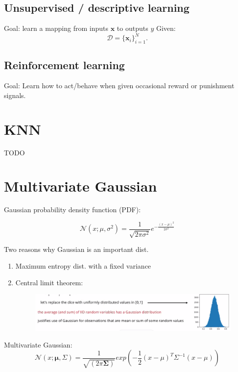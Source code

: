 \documentclass[12pt]{article}
\begin{document}
\subsection{Unsupervised / descriptive learning}
Goal: learn a mapping from inputs \(\mathbf{x}\) to outputs \(y\)
\newline
Given:
\[
    \mathcal{D} = \lbrace \mathbf{x}_i \rbrace_{i=1}^{N}.
\]

\subsection{Reinforcement learning}
Goal: Learn how to act/behave when given occasional reward or punishment signals.

\section{KNN}
TODO

\section{Multivariate Gaussian}
Gaussian probability density function (PDF):

\[
    \mathcal{N}(x;\mu,\sigma^2) = \frac{1}{\sqrt{2\pi\sigma^2}} e^{-\frac{(x-\mu)^2}{2\sigma^2}}
\]

Two reasons why Gaussian is an important dist.
\begin{enumerate}
    \item Maximum entropy dist. with a fixed variance
    \item {
        Central limit theorem:
        \begin{figure}[h]
        \includegraphics[width=\textwidth]{lec-6-gaussian.PNG}
        \end{figure}
    }
\end{enumerate}

Multivariate Gaussian:
\[
    \mathcal{N}(x;\mathbf{\mu},\Sigma) = \frac{1}{\sqrt{(2\pi\mathbf{\Sigma})}}exp(-\frac{1}{2}(x-\mu)^T\Sigma^{-1}(x-\mu))
\]

\printbibliography
\end{document}
